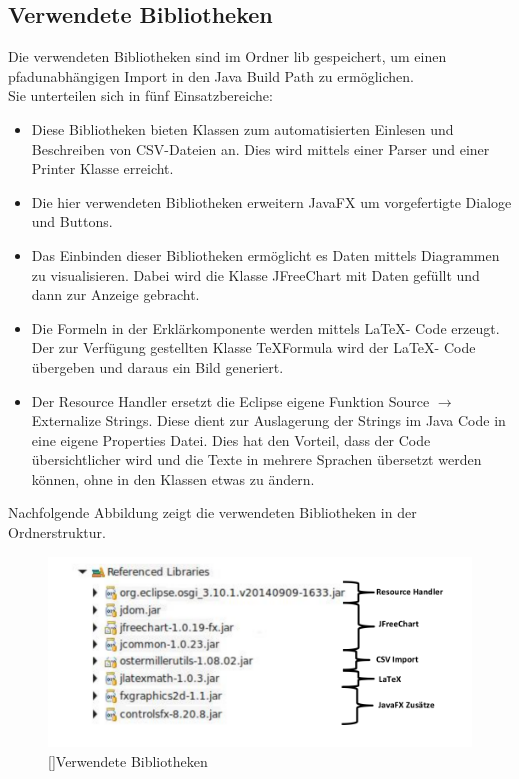 \documentclass[12pt,a4paper, listof=entryprefix, bibliography=totocnumbered,toc=listofnumbered,lof=listofnumbered]{scrartcl}
\begin{document}
\subsection{Verwendete Bibliotheken}
Die verwendeten Bibliotheken sind im Ordner lib gespeichert, um einen pfadunabhängigen Import in den Java Build Path zu ermöglichen. 
\\
Sie unterteilen sich in fünf Einsatzbereiche:
\begin{itemize}
	\item[CSV-Import:] Diese Bibliotheken bieten Klassen zum automatisierten Einlesen und Beschreiben von \gls{CSV}-Dateien an. Dies wird mittels einer Parser und einer Printer Klasse erreicht.
	\item[JavaFX Zusätze:] Die hier verwendeten Bibliotheken erweitern JavaFX um vorgefertigte Dialoge und Buttons.
	\item[JFreeChart:] Das Einbinden dieser Bibliotheken ermöglicht es Daten mittels Diagrammen zu visualisieren. Dabei wird die Klasse JFreeChart mit Daten gefüllt und dann zur Anzeige gebracht.
	\item[\LaTeX :] Die Formeln in der Erklärkomponente werden mittels \LaTeX - Code erzeugt. Der zur Verfügung gestellten Klasse TeXFormula wird der \LaTeX - Code übergeben und daraus ein Bild generiert.
	\item[Resource Handler:] Der Resource Handler ersetzt die Eclipse eigene Funktion Source $\rightarrow$ Externalize Strings. Diese dient zur Auslagerung der Strings im Java Code in eine eigene Properties Datei. Dies hat den Vorteil, dass der Code übersichtlicher wird und die Texte in mehrere Sprachen übersetzt werden können, ohne in den Klassen etwas zu ändern.
\end{itemize}

Nachfolgende Abbildung zeigt die verwendeten Bibliotheken in der Ordnerstruktur.
\begin{figure}[H]
	\centering
	\includegraphics[width=0.9\linewidth]{Bilder/libraries_beschriftet.png} 
	[]{Verwendete Bibliotheken}
	\label{fig:osgi}
\end{figure}
\end{document}
